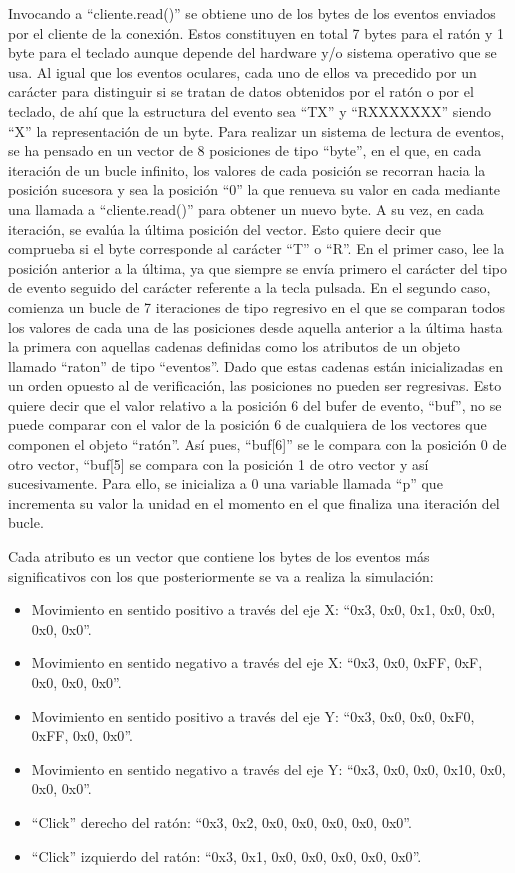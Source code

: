Invocando a ``cliente.read()'' se obtiene uno de los bytes de los eventos enviados por el cliente de la conexión. Estos constituyen en total 7 bytes para el ratón y 1 byte para el teclado aunque depende del hardware y/o sistema operativo que se usa. Al igual que los eventos oculares, cada uno de ellos va precedido por un carácter para distinguir si se tratan de datos obtenidos por el ratón o por el teclado, de ahí que la estructura del evento sea ``TX'' y ``RXXXXXXX'' siendo ``X'' la representación de un byte. Para realizar un sistema de lectura de eventos, se ha pensado en un vector de 8 posiciones de tipo ``byte'', en el que, en cada iteración de un bucle infinito, los valores de cada posición se recorran hacia la posición sucesora y sea la posición ``0'' la que renueva su valor en cada mediante una llamada a ``cliente.read()'' para obtener un nuevo byte. A su vez, en cada iteración, se evalúa la última posición del vector. Esto quiere decir que comprueba si el byte corresponde al carácter ``T'' o ``R''. En el primer caso, lee la posición anterior a la última, ya que siempre se envía primero el carácter del tipo de evento seguido del carácter referente a la tecla pulsada. En el segundo caso, comienza un bucle de 7 iteraciones de tipo regresivo en el que se comparan todos los valores de cada una de las posiciones desde aquella anterior a la última hasta la primera con aquellas cadenas definidas como los atributos de un objeto llamado ``raton'' de tipo ``eventos''. Dado que estas cadenas están inicializadas en un orden opuesto al de verificación, las posiciones no pueden ser regresivas. Esto quiere decir que el valor relativo a la posición 6 del bufer de evento, ``buf'', no se puede comparar con el valor de la posición 6 de cualquiera de los vectores que componen el objeto ``ratón''. Así pues, ``buf[6]'' se le compara con la posición 0 de otro vector, ``buf[5] se compara con la posición 1 de otro vector y así sucesivamente. Para ello, se inicializa a 0 una variable llamada ``p'' que incrementa su valor la unidad en el momento en el que finaliza una iteración del bucle.

Cada atributo es un vector que contiene los bytes de los eventos más significativos con los que posteriormente se va a realiza la simulación:

\begin{itemize}
    \item Movimiento en sentido positivo a través del eje X: ``{0x3, 0x0, 0x1, 0x0, 0x0, 0x0, 0x0}''.
    \item Movimiento en sentido negativo a través del eje X: ``{0x3, 0x0, 0xFF, 0xF, 0x0, 0x0, 0x0}''.
    \item Movimiento en sentido positivo a través del eje Y: ``{0x3, 0x0, 0x0, 0xF0, 0xFF, 0x0, 0x0}''.
    \item Movimiento en sentido negativo a través del eje Y: ``{0x3, 0x0, 0x0, 0x10, 0x0, 0x0, 0x0}''.
    \item ``Click'' derecho del ratón: ``{0x3, 0x2, 0x0, 0x0, 0x0, 0x0, 0x0}''.
    \item ``Click'' izquierdo del ratón: ``{0x3, 0x1, 0x0, 0x0, 0x0, 0x0, 0x0}''.
\end{itemize}

